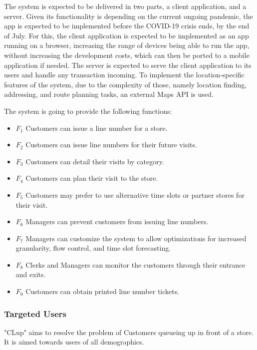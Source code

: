 The system is expected to be delivered in two parts, a client application, and a server.
Given its functionality is depending on the current ongoing pandemic, the app is expected to be implemented before the COVID-19 crisis ends, by the end of July.
For this, the client application is expected to be implemented as an app running on a browser, increasing the range of devices being able to run the app, without increasing the development costs, which can then be ported to a mobile application if needed.
The server is expected to serve the client application to its users and handle any transaction incoming.
To implement the location-specific features of the system, due to the complexity of those, namely location finding, addressing, and route planning tasks, an external Maps API is used.

The system is going to provide the following functions:
\begin{itemize}
    \item \textbf{$F_{1}$} Customers can issue a line number for a store.
    \item \textbf{$F_{2}$} Customers can issue line numbers for their future visits.
    \item \textbf{$F_{3}$} Customers can detail their visits by category.
    \item \textbf{$F_{4}$} Customers can plan their visit to the store.
    \item \textbf{$F_{5}$} Customers may prefer to use alternative time slots or partner stores for their visit.
    \item \textbf{$F_{6}$} Managers can prevent customers from issuing line numbers.
    \item \textbf{$F_{7}$} Managers can customize the system to allow optimizations for increased granularity, flow control, and time slot forecasting.
    \item \textbf{$F_{8}$} Clerks and Managers can monitor the customers through their entrance and exits.
    \item \textbf{$F_{9}$} Customers can obtain printed line number tickets.
\end{itemize}

\subsubsection{Targeted Users}
"CLup" aims to resolve the problem of Customers queueing up in front of a store.
It is aimed towards users of all demographics.
\\[0.5cm]

